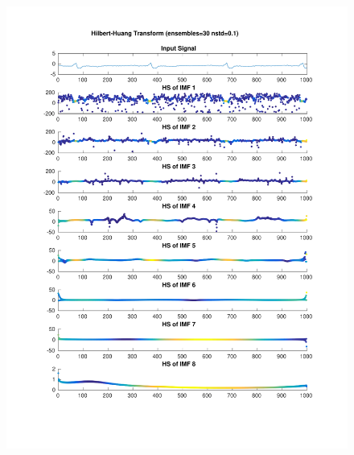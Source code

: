 \documentclass{beamer}
\begin{document}
\begin{frame}
\begin{columns}
\begin{figure}
\includegraphics[width=\textwidth]{fig/118l1_hht_ensemble.pdf}
\end{figure}
\end{columns}
\end{frame}


\end{document}
